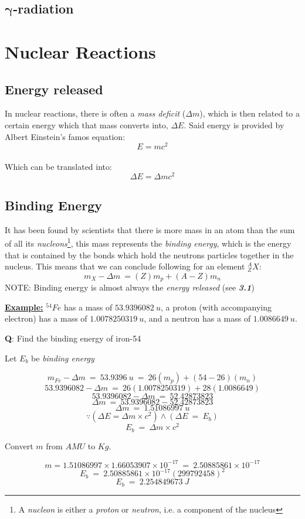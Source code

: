 \documentclass[12pt]{article}
\begin{document}
\subsection{$\bm{\gamma}$-radiation}

\newpage

\section{Nuclear Reactions}

\subsection{Energy released}

In nuclear reactions, there is often a \emph{mass deficit} ($\Delta m$), which is then related to a certain energy which that mass converts into, $\Delta E$. Said energy is provided by Albert Einstein's famos equation: $$E = mc^2$$ \\
Which can be translated into: $$\Delta E = \Delta mc^2$$

\subsection{Binding Energy}
It has been found by scientists that there is more mass in an atom than the sum of all its \emph{nucleons}\footnote{A \emph{nucleon} is either a \emph{proton} or \emph{neutron}, i.e. a component of the nucleus}, this mass represents the \emph{binding energy}, which is the energy that is contained by the bonds which hold the neutrons particles together in the nucleus. This means that we can conclude following for an element $^{A}_{Z}X$: $$m_X - \Delta m \ = (Z)m_p + (A-Z)m_n$$
\bigbreak
NOTE: Binding energy is almost always the \emph{energy released} (see \textbf{\emph{3.1}})

\newpage

\begin{boxA}
	\textbf{\underline{Example:}}\bigbreak
	$^{54}Fe$ has a mass of $53.9396082 \ u$, a proton (with accompanying electron)
 has a mass of $1.0078250319 \ u$, and a neutron has a mass of $1.0086649 \ u$. \bigbreak

 \textbf{Q}: Find the binding energy of iron-54 \bigbreak

 Let $E_b$ be \emph{binding energy}

$$m_{Fe} - \Delta m \ = \ 53.9396 \ u \ = \ 26(m_p) + (54-26)(m_n)$$
$$53.9396082 - \Delta m \ = \ 26(1.0078250319) + 28(1.0086649)$$
$$53.9396082 - \Delta m \ = \ 52.42873823$$
$$\Delta m \ = \ 53.9396082 - 52.42873823$$
$$\Delta m \ = \ 1.51086997 \ u$$ \bigbreak
$$\because \left(\Delta E = \Delta m \times c^2 \right) \land \left(\Delta E \ = \ E_b \right)$$
$$E_b \ = \ \Delta m \times c^2$$
\begin{center}
Convert $m$ from $AMU$ to $Kg$. 
\end{center}
$$m = 1.51086997 \times 1.66053907 \times 10^{-17} \ = \ 2.50885861 \times 10^{-17}$$
$$E_b \ = \ 2.50885861 \times 10^{-17}(299 792 458)^2$$
$$E_b \ = \ 2.254849673 \ J$$
\end{boxA}
\end{document}
